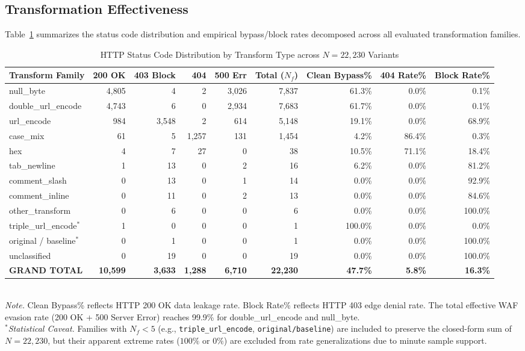 \subsection{Transformation Effectiveness}
Table~\ref{tab:transform_stats} summarizes the status code distribution and empirical bypass/block rates decomposed across all evaluated transformation families.

\begin{table}[t]
  \centering
  \caption{HTTP Status Code Distribution by Transform Type across $N=22{,}230$ Variants}
  \label{tab:transform_stats}
  \begin{tabular}{lrrrrrrrr}
    \toprule
    \textbf{Transform Family} & \textbf{200 OK} & \textbf{403 Block} & \textbf{404} & \textbf{500 Err} & \textbf{Total ($N_f$)} & \textbf{Clean Bypass\%} & \textbf{404 Rate\%} & \textbf{Block Rate\%} \\
    \midrule
    null\_byte & 4{,}805 & 4 & 2 & 3{,}026 & 7{,}837 & 61.3\% & 0.0\% & 0.1\% \\
    double\_url\_encode & 4{,}743 & 6 & 0 & 2{,}934 & 7{,}683 & 61.7\% & 0.0\% & 0.1\% \\
    url\_encode & 984 & 3{,}548 & 2 & 614 & 5{,}148 & 19.1\% & 0.0\% & 68.9\% \\
    case\_mix & 61 & 5 & 1{,}257 & 131 & 1{,}454 & 4.2\% & 86.4\% & 0.3\% \\
    hex & 4 & 7 & 27 & 0 & 38 & 10.5\% & 71.1\% & 18.4\% \\
    tab\_newline & 1 & 13 & 0 & 2 & 16 & 6.2\% & 0.0\% & 81.2\% \\
    comment\_slash & 0 & 13 & 0 & 1 & 14 & 0.0\% & 0.0\% & 92.9\% \\
    comment\_inline & 0 & 11 & 0 & 2 & 13 & 0.0\% & 0.0\% & 84.6\% \\
    other\_transform & 0 & 6 & 0 & 0 & 6 & 0.0\% & 0.0\% & 100.0\% \\
    triple\_url\_encode$^*$ & 1 & 0 & 0 & 0 & 1 & 100.0\% & 0.0\% & 0.0\% \\
    original / baseline$^*$ & 0 & 1 & 0 & 0 & 1 & 0.0\% & 0.0\% & 100.0\% \\
    unclassified & 0 & 19 & 0 & 0 & 19 & 0.0\% & 0.0\% & 100.0\% \\
    \midrule
    \textbf{GRAND TOTAL} & \textbf{10{,}599} & \textbf{3{,}633} & \textbf{1{,}288} & \textbf{6{,}710} & \textbf{22{,}230} & \textbf{47.7\%} & \textbf{5.8\%} & \textbf{16.3\%} \\
    \bottomrule
  \end{tabular}\\[0.4em]
  \footnotesize
  \emph{Note.} Clean Bypass\% reflects HTTP 200 OK data leakage rate. Block Rate\% reflects HTTP 403 edge denial rate. The total effective WAF evasion rate (200 OK + 500 Server Error) reaches 99.9\% for double\_url\_encode and null\_byte.\\
  $^*$\emph{Statistical Caveat.} Families with $N_f < 5$ (e.g., \texttt{triple\_url\_encode}, \texttt{original/baseline}) are included to preserve the closed-form sum of $N=22{,}230$, but their apparent extreme rates ($100\%$ or $0\%$) are excluded from rate generalizations due to minute sample support.
\end{table}


